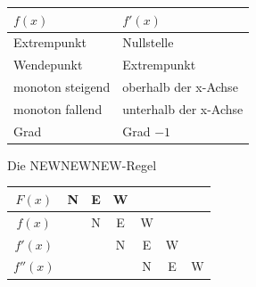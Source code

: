 \documentclass[paper=a6,ngerman,twoside=true,fontsize=14pt, parskip = half]{scrartcl}
\begin{document}
\begin{antwort}
  \begin{center}
    \renewcommand{\arraystretch}{1.3}
    \begin{tabular}{l | l}
      \textbf{$f(x)$} & \textbf{$f'(x)$} \\
      \hline
      Extrempunkt & Nullstelle \\
      Wendepunkt & Extrempunkt \\
      monoton steigend & oberhalb der x-Achse \\
      monoton fallend & unterhalb der x-Achse \\
      Grad & Grad $-1$ \\
    \end{tabular}
  \end{center}
\end{antwort}
\begin{frage}
	Die NEWNEWNEW-Regel
\end{frage}
\begin{antwort}
\begin{center}
\begin{tabular}{c|c|c|c|c|c|c}
	$F(x)$      & N & E & W &   &   &   \\ \hline
	$f(x)$      &   & N & E & W &   &   \\ \hline
	$f'(x)$     &   &   & N & E & W &   \\ \hline
	$f''(x)$    &   &   &   & N & E & W
\end{tabular}
\end{center}
\end{antwort}
\end{document}
